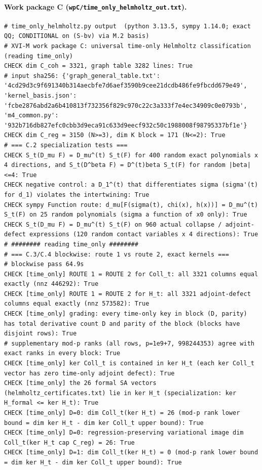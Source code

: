 \documentclass{article}
\theoremstyle{remark}
\begin{document}
\paragraph{Work package C (\texttt{wpC/time\_only\_helmholtz\_out.txt}).}
\begin{lstlisting}
# time_only_helmholtz.py output  (python 3.13.5, sympy 1.14.0; exact QQ; CONDITIONAL on (S-bv) via M.2 basis)
# XVI-M work package C: universal time-only Helmholtz classification (reading time_only)
CHECK dim C_coh = 3321, graph table 3282 lines: True
# input sha256: {'graph_general_table.txt': '4cd29d3c9f691340b314aecbfe7d6aef3590b9cee21dcdb486fe9fbcdd679e49', 'kernel_basis.json': 'fcbe2876abd2a6b410813f732356f829c970c22c3a333f7e4ec34909c0e0793b', 'm4_common.py': '932b716db827efc0cbb3d9eca91c633d9eecf932c50c1988008f98795337bf1e'}
CHECK dim C_reg = 3150 (N>=3), dim K block = 171 (N<=2): True
# === C.2 specialization tests ===
CHECK S_t(D_mu F) = D_mu^(t) S_t(F) for 400 random exact polynomials x 4 directions, and S_t(D^beta F) = D^(t)beta S_t(F) for random |beta|<=4: True
CHECK negative control: a D_1^(t) that differentiates sigma (sigma'(t) for d_1) violates the intertwining: True
CHECK sympy Function route: d_mu[F(sigma(t), chi(x), h(x))] = D_mu^(t) S_t(F) on 25 random polynomials (sigma a function of x0 only): True
CHECK S_t(D_mu F) = D_mu^(t) S_t(F) on 960 actual collapse / adjoint-defect expressions (120 random contact variables x 4 directions): True
# ######## reading time_only ########
# === C.3/C.4 blockwise: route 1 vs route 2, exact kernels ===
# blockwise pass 64.9s
CHECK [time_only] ROUTE 1 = ROUTE 2 for Coll_t: all 3321 columns equal exactly (nnz 446292): True
CHECK [time_only] ROUTE 1 = ROUTE 2 for H_t: all 3321 adjoint-defect columns equal exactly (nnz 573582): True
CHECK [time_only] grading: every time-only key in block (D, parity) has total derivative count D and parity of the block (blocks have disjoint rows): True
# supplementary mod-p ranks (all rows, p=1e9+7, 998244353) agree with exact ranks in every block: True
CHECK [time_only] ker Coll_t is contained in ker H_t (each ker Coll_t vector has zero time-only adjoint defect): True
CHECK [time_only] the 26 formal SA vectors (helmholtz_certificates.txt) lie in ker H_t (specialization: ker H_formal <= ker H_t): True
CHECK [time_only] D=0: dim Coll_t(ker H_t) = 26 (mod-p rank lower bound = dim ker H_t - dim ker Coll_t upper bound): True
CHECK [time_only] D=0: regression-preserving variational image dim Coll_t(ker H_t cap C_reg) = 26: True
CHECK [time_only] D=1: dim Coll_t(ker H_t) = 0 (mod-p rank lower bound = dim ker H_t - dim ker Coll_t upper bound): True

\end{lstlisting}
\end{document}
